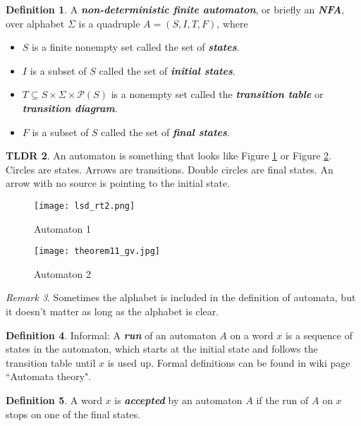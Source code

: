 \documentclass{article}
\theoremstyle{definition}
\newtheorem{definition}{Definition}[section]
\theoremstyle{remark}
\newtheorem{remark}[definition]{Remark}
\theoremstyle{remark}
\theoremstyle{plain}
\theoremstyle{definition}
\newtheorem{tldr}[definition]{TLDR}
\newcommand{\term}[1]{\emph{\textbf{#1}}}
\begin{document}
\begin{definition}
A \term{non-deterministic finite automaton}, or briefly an \term{NFA}, over alphabet $\Sigma$ is a quadruple $A = (S, I, T, F)$, where
	\begin{itemize}
		\item $S$ is a finite nonempty set called the set of \term{states}.
		\item $I$ is a subset of $S$ called the set of \term{initial states}.
		\item $T \subseteq S \times \Sigma \times \mathcal{P}(S)$ is a nonempty set called the \term{transition table} or \term{transition diagram}.
		\item $F$ is a subset of $S$ called the set of \term{final states}.
	\end{itemize}
\end{definition}

\begin{tldr}
An automaton is something that looks like Figure \ref{fig:automaton1} or Figure \ref{fig:automaton2}. Circles are states. Arrows are transitions. Double circles are final states. An arrow with no source is pointing to the initial state.
\end{tldr}

\begin{figure}[h]
    \centering
    \texttt{[image: lsd\_rt2.png]}
    \caption{Automaton 1}
    \label{fig:automaton1}
\end{figure}
\begin{figure}[h]
    \centering
    \texttt{[image: theorem11\_gv.jpg]}
    \caption{Automaton 2}
    \label{fig:automaton2}
\end{figure}

\begin{remark}
Sometimes the alphabet is included in the definition of automata, but it doesn't matter as long as the alphabet is clear. 
\end{remark}
\newpage
\begin{definition}
Informal: A \term{run} of an automaton $A$ on a word $x$ is a sequence of states in the automaton, which starts at the initial state and follows the transition table until $x$ is used up. 
Formal definitions can be found in wiki page ``Automata theory". 
\end{definition}

\begin{definition}
A word $x$ is \term{accepted} by an automaton $A$ if the run of $A$ on $x$ stops on one of the final states.
\end{definition}
\end{document}

